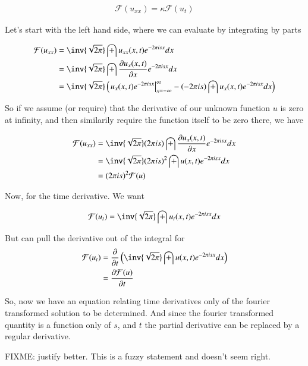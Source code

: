\documentclass{article}
\newcommand{\FF}[0]{\mathcal{F}}
\begin{document}
\begin{align*}
\FF(u_{xx}) = \kappa \FF(u_t)
\end{align*}

Let's start with the left hand side, where we can evaluate by integrating by parts

\begin{align*}
\FF(u_{xx}) 
&= \inv{\sqrt{2\pi}} \int u_{xx}(x, t) e^{- 2 \pi i s x } dx \\
&= \inv{\sqrt{2\pi}} \int \PD{x}{u_x(x, t)} e^{- 2 \pi i s x } dx \\
&= \inv{\sqrt{2\pi}} 
\left(
{\left. u_x(x, t) e^{- 2 \pi i s x } \right\vert}_{x= -\infty}^\infty
-( - 2 \pi i s ) \int u_x(x, t) e^{- 2 \pi i s x } dx 
\right) \\
\end{align*}

So if we assume (or require) that the derivative of our unknown function $u$ is zero at infinity, and then similarily
require the function itself to be zero there, we have

\begin{align*}
\FF(u_{xx}) 
&= \inv{\sqrt{2\pi}} ( 2 \pi i s ) \int \PD{x}{u_x(x, t)} e^{- 2 \pi i s x } dx  \\
&= \inv{\sqrt{2\pi}} ( 2 \pi i s )^2 \int u(x, t) e^{- 2 \pi i s x } dx  \\
&= ( 2 \pi i s )^2 \FF(u)
\end{align*}

Now, for the time derivative.  We want

\begin{align*}
\FF(u_t) &= \inv{\sqrt{2\pi}} \int u_t(x, t) e^{- 2 \pi i s x } dx \\
\end{align*}

But can pull the derivative out of the integral for
\begin{align*}
\FF(u_t)
&= \PD{t}{} \left(\inv{\sqrt{2\pi}} \int u(x, t) e^{- 2 \pi i s x } dx \right) \\
&= \PD{t}{\FF(u)} 
\end{align*}

So, now we have an equation relating time derivatives only of the fourier transformed solution to be determined.  And since the fourier transformed quantity is a function only of $s$, and $t$ the partial derivative can be replaced by a regular derivative.

FIXME: justify better.  This is a fuzzy statement and doesn't seem right.
\end{document}
